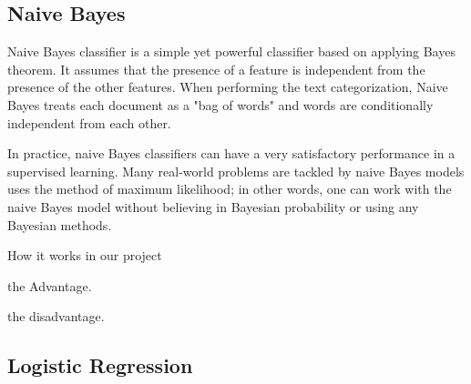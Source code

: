 
\subsection{Naive Bayes}
Naive Bayes \cite{NaiveBayes} classifier is a simple yet powerful classifier based on applying Bayes theorem. It assumes that the presence of a feature is independent from the presence of the other features. When performing the text categorization, Naive Bayes treats each document as a "bag of words" and words are conditionally independent from each other.

In practice, naive Bayes classifiers can have a very satisfactory performance in a supervised learning. Many real-world problems are tackled by naive Bayes models uses the method of maximum likelihood; in other words, one can work with the naive Bayes model without believing in Bayesian probability or using any Bayesian methods.


How it works in our project

the Advantage.

the disadvantage.
\subsection{Logistic Regression}

